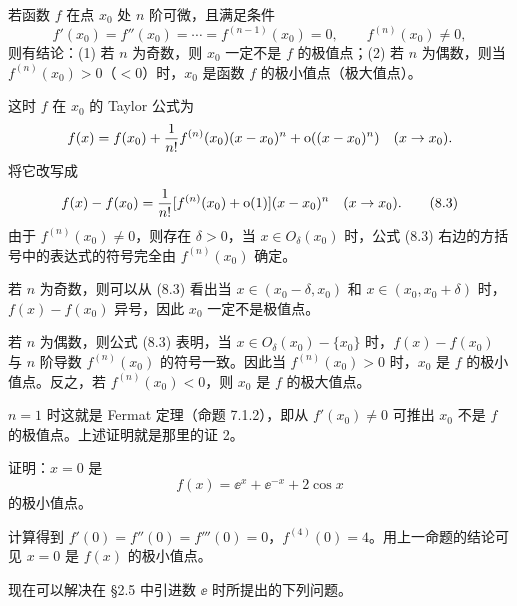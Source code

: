 \begin{xexample}[8.3.1]
若函数 $f$ 在点 $x_0$ 处 $n$ 阶可微，且满足条件
\[
  f'(x_0)=f''(x_0)=\cdots=f^{(n-1)}(x_0)=0,\qquad f^{(n)}(x_0)\ne0,
\]
则有结论：(1) 若 $n$ 为奇数，则 $x_0$ 一定不是 $f$ 的极值点；(2) 若 $n$ 为偶数，则当 $f^{(n)}(x_0)>0$（$<0$）时，$x_0$ 是函数 $f$ 的极小值点（极大值点）。
\end{xexample}
\begin{xproof}
这时 $f$ 在 $x_0$ 的 Taylor 公式为
\[
  f(x)=f(x_0)+\frac1{n!}f^{(n)}(x_0)(x-x_0)^n+\mathrm{o}((x-x_0)^n)\quad(x\to x_0).
\]
将它改写成
\begin{equation}
  f(x)-f(x_0)=\frac1{n!}[f^{(n)}(x_0)+\mathrm{o}(1)](x-x_0)^n\quad(x\to x_0).
  \tag{8.3}
  \label{eq:8.3}
\end{equation}
由于 $f^{(n)}(x_0)\ne0$，则存在 $\delta>0$，当 $x\in O_\delta(x_0)$ 时，公式 (8.3) 右边的方括号中的表达式的符号完全由 $f^{(n)}(x_0)$ 确定。

若 $n$ 为奇数，则可以从 (8.3) 看出当 $x\in(x_0-\delta,x_0)$ 和 $x\in(x_0,x_0+\delta)$ 时，$f(x)-f(x_0)$ 异号，因此 $x_0$ 一定不是极值点。

若 $n$ 为偶数，则公式 (8.3) 表明，当 $x\in O_\delta(x_0)-\{x_0\}$ 时，$f(x)-f(x_0)$ 与 $n$ 阶导数 $f^{(n)}(x_0)$ 的符号一致。因此当 $f^{(n)}(x_0)>0$ 时，$x_0$ 是 $f$ 的极小值点。反之，若 $f^{(n)}(x_0)<0$，则 $x_0$ 是 $f$ 的极大值点。
\end{xproof}

\begin{xremark}
$n=1$ 时这就是 Fermat 定理（命题 7.1.2），即从 $f'(x_0)\ne0$ 可推出 $x_0$ 不是 $f$ 的极值点。上述证明就是那里的证 2。
\end{xremark}

\begin{xexample}[8.3.2]
证明：$x=0$ 是
\[
  f(x)=\ee^x+\ee^{-x}+2\cos x
\]
的极小值点。
\end{xexample}
\begin{xproof}
计算得到 $f'(0)=f''(0)=f'''(0)=0$，$f^{(4)}(0)=4$。用上一命题的结论可见 $x=0$ 是 $f(x)$ 的极小值点。
\end{xproof}

现在可以解决在 §2.5 中引进数 $\ee$ 时所提出的下列问题。

